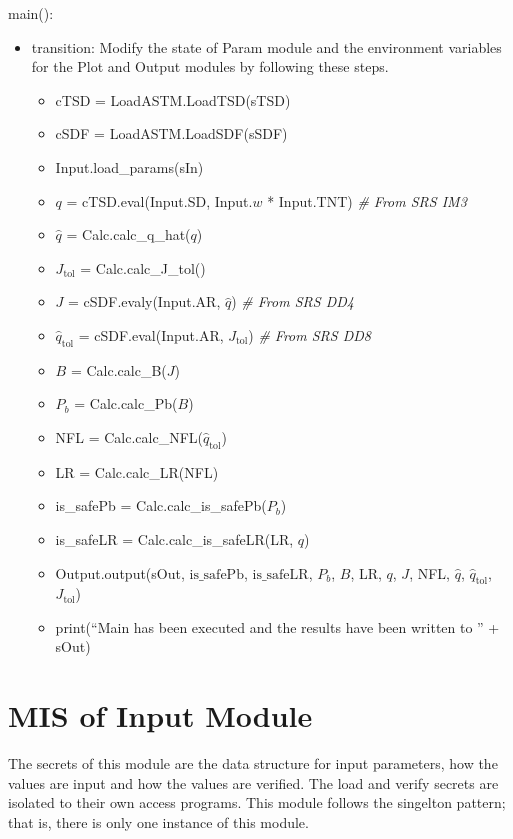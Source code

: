 \documentclass[12pt, titlepage]{article}
\begin{document}
\noindent main():
\begin{itemize}
\item transition: Modify the state of Param module and the environment variables
  for the Plot and Output modules by following these steps.
\begin{itemize}
\item cTSD = LoadASTM.LoadTSD(sTSD)
\item cSDF = LoadASTM.LoadSDF(sSDF)
\item Input.load\_params(sIn)
\item $q$ = cTSD.eval(Input.SD, Input.$w$ * Input.TNT) \textit{\# From SRS IM3}
\item $\hat{q}$ = Calc.calc\_q\_hat($q$)
\item $J_\text{tol}$ = Calc.calc\_J\_tol()
\item $J$ = cSDF.evaly(Input.AR, $\hat{q}$) \textit{\# From SRS DD4}
\item $\hat{q}_\text{tol}$ = cSDF.eval(Input.AR, $J_\text{tol}$) \textit{\# From SRS DD8}
\item $B$ = Calc.calc\_B($J$)
\item $P_b$ = Calc.calc\_Pb($B$)
\item NFL = Calc.calc\_NFL($\hat{q}_\text{tol}$)
\item LR = Calc.calc\_LR(NFL)
\item is\_safePb = Calc.calc\_is\_safePb($P_b$)
\item is\_safeLR = Calc.calc\_is\_safeLR(LR, $q$)
\item Output.output(sOut, $\mbox{is\_safePb}$, $\mbox{is\_safeLR}$, $P_b$, $B$, LR, $q$, $J$, NFL, $\hat{q}$,
         $\hat{q}_{\text{tol}}$, $J_{\text{tol}}$)
\item print(``Main has been executed and the results have been written to '' + sOut)
\end{itemize}
\end{itemize}

\newpage


\section{MIS of Input Module} \label{Input}

The secrets of this module are the data structure for input parameters, how the
values are input and how the values are verified.  The load and verify secrets
are isolated to their own access programs.  This module follows the singelton
pattern; that is, there is only one instance of this module.
\end{document}
